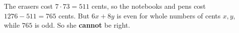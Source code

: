The erasers cost $7\cdot73=511$ cents, so the notebooks and pens cost $1276-511=765$ cents. But $6x+8y$ is even for whole numbers of cents $x,y$, while $765$ is odd. So she \textbf{cannot} be right.
